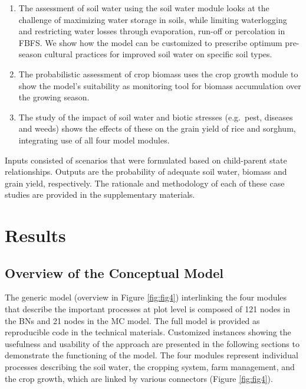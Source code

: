 \documentclass[]{elsarticle} %
\begin{document}
\begin{enumerate}
\def\labelenumi{\arabic{enumi}.}
\item
  The assessment of soil water using the soil water module looks at the challenge of maximizing water storage in soils, while limiting waterlogging and restricting water losses through evaporation, run-off or percolation in FBFS. We show how the model can be customized to prescribe optimum pre-season cultural practices for improved soil water on specific soil types.
\item
  The probabilistic assessment of crop biomass uses the crop growth module to show the model's suitability as monitoring tool for biomass accumulation over the growing season.
\item
  The study of the impact of soil water and biotic stresses (e.g.~pest, diseases and weeds) shows the effects of these on the grain yield of rice and sorghum, integrating use of all four model modules.
\end{enumerate}

Inputs consisted of scenarios that were formulated based on child-parent state relationships. Outputs are the probability of adequate soil water, biomass and grain yield, respectively. The rationale and methodology of each of these case studies are provided in the supplementary materials.

\hypertarget{ref4}{%
\section{Results}\label{ref4}}

\hypertarget{ref41}{%
\subsection{Overview of the Conceptual Model}\label{ref41}}

The generic model (overview in Figure \ref{fig:fig4}) interlinking the four modules that describe the important processes at plot level is composed of 121 nodes in the BNs and 21 nodes in the MC model. The full model is provided as reproducible code in the technical materials. Customized instances showing the usefulness and usability of the approach are presented in the following sections to demonstrate the functioning of the model. The four modules represent individual processes describing the soil water, the cropping system, farm management, and the crop growth, which are linked by various connectors (Figure \ref{fig:fig4}).
\end{document}
